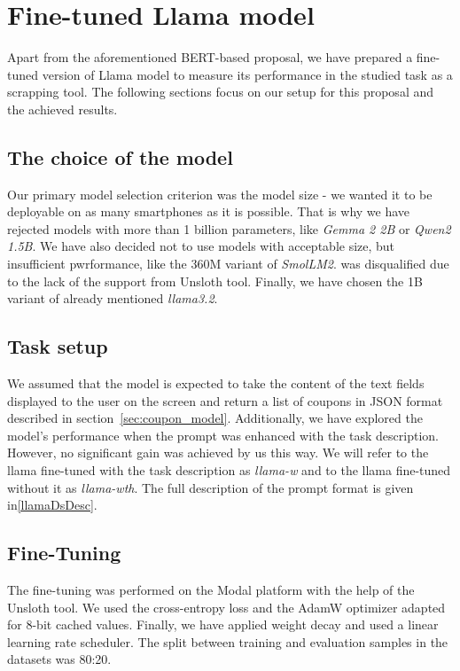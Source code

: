 \documentclass[licencjacka,en]{pracamgr}
\begin{document}
\chapter{Fine-tuned Llama model}
Apart from the aforementioned BERT-based proposal, we have prepared a fine-tuned version of Llama\cite{meta-llama} model to measure its performance in the studied task as a scrapping tool. The following sections focus on our setup for this proposal and the achieved results.

\section{The choice of the model}
Our primary model selection criterion was the model size - we wanted it to be deployable on as many smartphones as it is possible. That is why we have rejected models with more than 1 billion parameters, like \emph{Gemma 2 2B}\cite{gemma2} or \emph{Qwen2 1.5B}\cite{yang2024qwen2technicalreport}. We have also decided not to use models with acceptable size, but insufficient pwrformance, like the 360M variant of \emph{SmolLM2}\cite{smollm2}. \cite{gpt-neo} was disqualified due to the lack of the support from Unsloth tool. Finally, we have chosen the 1B variant of already mentioned \emph{llama3.2}.

\section{Task setup}
We assumed that the model is expected to take the content of the text fields displayed to the user on the screen and return a list of coupons in JSON format described in section~\ref{sec:coupon_model}. Additionally, we have explored the model's performance when the prompt was enhanced with the task description. However, no significant gain was achieved by us this way. We will refer to the llama fine-tuned with the task description as \emph{llama-w} and to the llama fine-tuned without it as \emph{llama-wth}. The full description of the prompt format is given in\ref{llamaDsDesc}.
\section{Fine-Tuning}
The fine-tuning was performed on the Modal platform with the help of the Unsloth tool. We used the cross-entropy loss\cite{mao2023crossentropylossfunctionstheoretical} and the AdamW optimizer adapted for 8-bit cached values\cite{hf-bnb}. Finally, we have applied weight decay and used a linear learning rate scheduler. The split between training and evaluation samples in the datasets was 80:20.
\end{document}
